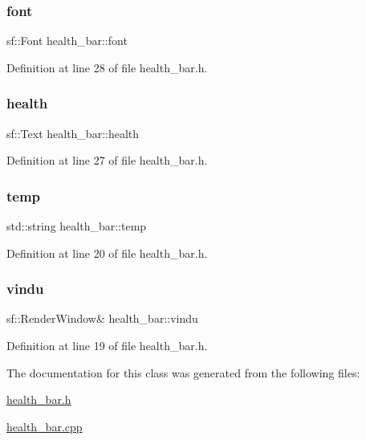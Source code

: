 \subsubsection{\texorpdfstring{font}{font}}
{\footnotesize\ttfamily sf\+::\+Font health\+\_\+bar\+::font}



Definition at line 28 of file health\+\_\+bar.\+h.

\hypertarget{classhealth__bar_a9ce78c10bf9cf0c2fc9b20e97ff28287}{}\label{classhealth__bar_a9ce78c10bf9cf0c2fc9b20e97ff28287} 
\subsubsection{\texorpdfstring{health}{health}}
{\footnotesize\ttfamily sf\+::\+Text health\+\_\+bar\+::health}



Definition at line 27 of file health\+\_\+bar.\+h.

\hypertarget{classhealth__bar_a3c36fece875720fe40d8619ab466a5bd}{}\label{classhealth__bar_a3c36fece875720fe40d8619ab466a5bd} 
\subsubsection{\texorpdfstring{temp}{temp}}
{\footnotesize\ttfamily std\+::string health\+\_\+bar\+::temp\hspace{0.3cm}{\ttfamily [protected]}}



Definition at line 20 of file health\+\_\+bar.\+h.

\hypertarget{classhealth__bar_af18cd32e25dd9a6d699aed82dcf1c81c}{}\label{classhealth__bar_af18cd32e25dd9a6d699aed82dcf1c81c} 
\subsubsection{\texorpdfstring{vindu}{vindu}}
{\footnotesize\ttfamily sf\+::\+Render\+Window\& health\+\_\+bar\+::vindu\hspace{0.3cm}{\ttfamily [protected]}}



Definition at line 19 of file health\+\_\+bar.\+h.



The documentation for this class was generated from the following files\+:\begin{DoxyCompactItemize}
\item 
\hyperlink{health__bar_8h}{health\+\_\+bar.\+h}\item 
\hyperlink{health__bar_8cpp}{health\+\_\+bar.\+cpp}\end{DoxyCompactItemize}
